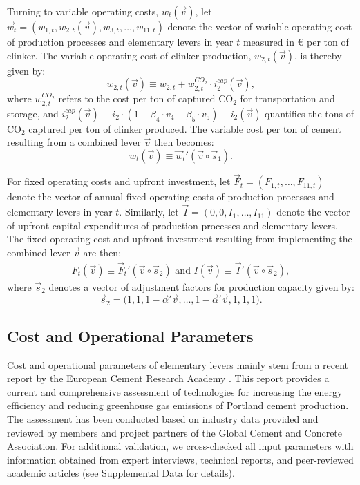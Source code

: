 \documentclass[12pt, a4paper]{article} %
\newcommand{\Suppl}{Supplemental}
\begin{document}
Turning to variable operating costs, $w_t(\vec{v})$, let $\vec{w}_t = (w_{1,t}, w_{2,t}(\vec{v}), w_{3,t}, \ldots, w_{11,t})$ denote the vector of variable operating cost of production processes and elementary levers in year $t$ measured in \euro$ $ per ton of clinker. The variable operating cost of clinker production, $w_{2,t}(\vec{v})$, is thereby given by:
\begin{equation}
w_{2,t}(\vec{v}) \equiv w_{2,t} + w_{2,t}^{CO_2} \cdot i_2^{cap}(\vec{v}),
\end{equation}
where $w_{2,t}^{CO_2}$ refers to the cost per ton of captured CO$_2$ for transportation and storage, and $i_2^{cap}(\vec{v}) \equiv i_2 \cdot (1 - \beta_4 \cdot v_4 - \beta_5 \cdot v_5) - i_2(\vec{v})$ quantifies the tons of CO$_2$ captured per ton of clinker produced. The variable cost per ton of cement resulting from a combined lever $\vec{v}$  then becomes:
\begin{equation}
w_t(\vec{v}) \equiv \vec{w}_t' (\vec{v} \circ \vec{s}_1).
\end{equation}

For fixed operating costs and upfront investment, let $\vec{F}_t = (F_{1,t}, \ldots, F_{11,t})$ denote the vector of annual fixed operating costs of production processes and elementary levers in year $t$. Similarly, let $\vec{I} = (0, 0, I_1, \ldots, I_{11})$ denote the vector of upfront capital expenditures of production processes and elementary levers. The fixed operating cost and upfront investment resulting from implementing the combined lever $\vec{v}$ are then:
\begin{gather}
F_t(\vec{v}) \equiv \vec{F}_t' (\vec{v} \circ \vec{s}_2) \text{ and } I(\vec{v}) \equiv \vec{I}' (\vec{v} \circ \vec{s}_2),
\end{gather}
where $\vec{s}_2$ denotes a vector of adjustment factors for production capacity given by:
$$\vec{s}_2 = \bigl(1, 1, 1-\vec{\alpha}'\vec{v}, \ldots, 1-\vec{\alpha}'\vec{v}, 1, 1, 1 \bigr).$$


\subsection*{Cost and Operational Parameters}

Cost and operational parameters of elementary levers mainly stem from a recent report by the European Cement Research Academy \citep{ecra2022state}. This report provides a current and comprehensive assessment of technologies for increasing the energy efficiency and reducing greenhouse gas emissions of Portland cement production. The assessment has been conducted based on industry data provided and reviewed by members and project partners of the Global Cement and Concrete Association. For additional validation, we cross-checked all input parameters with information obtained from expert interviews, technical reports, and peer-reviewed academic articles (see \Suppl$ $ Data for details).
\end{document}
